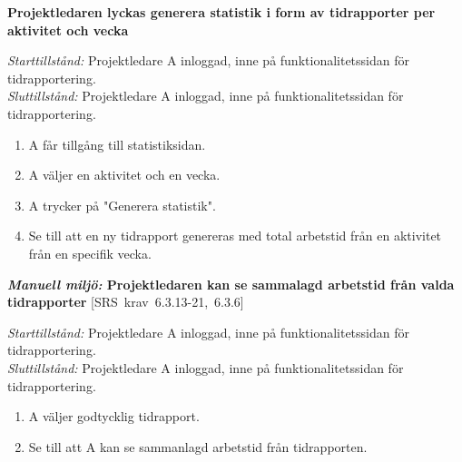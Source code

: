 \documentclass[a4paper]{article}
\def\reqinside{\hfil\penalty 100 \hfilneg \hbox}
\def \req [#1]{\reqinside{[SRS krav #1]}}
\begin{document}
\begin{FT}
\item
\textbf{Projektledaren lyckas generera statistik i form av tidrapporter per aktivitet och vecka}

\emph{Starttillstånd:} Projektledare A inloggad, inne på funktionalitetssidan för tidrapportering.\\
\emph{Sluttillstånd:} Projektledare A inloggad, inne på funktionalitetssidan för tidrapportering.

\begin{enumerate}
\item A får tillgång till statistiksidan.
\item A väljer en aktivitet och en vecka.
\item A trycker på "Generera statistik".
\item Se till att en ny tidrapport genereras med total arbetstid från en aktivitet från en specifik vecka.
\end{enumerate}


\item
\textbf{\emph{Manuell miljö:} Projektledaren kan se sammalagd arbetstid från valda tidrapporter} \req[6.3.13-21, 6.3.6]

\emph{Starttillstånd:} Projektledare A inloggad, inne på funktionalitetssidan för tidrapportering.\\
\emph{Sluttillstånd:} Projektledare A inloggad, inne på funktionalitetssidan för tidrapportering.

\begin{enumerate}
\item A väljer godtycklig tidrapport.
\item Se till att A kan se sammanlagd arbetstid från tidrapporten.
\end{enumerate}





\end{FT}
\end{document}

